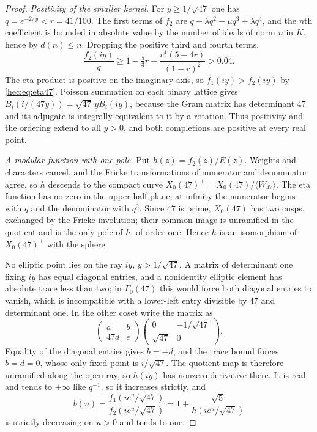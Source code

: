 \begin{proof}
\emph{Positivity of the smaller kernel.}
For $y\ge1/\sqrt{47}$ one has $q=e^{-2\pi y}<r=41/100$. The first terms of $f_2$ are
$q-\lambda q^2-\mu q^3+\lambda q^4$, and the $n$th coefficient is bounded in absolute value by the number
of ideals of norm $n$ in $K$, hence by $d(n)\le n$. Dropping the positive third and fourth terms,
\[
 \frac{f_2(iy)}q\ge1-\tfrac53r-\frac{r^4(5-4r)}{(1-r)^2}>0.04 .
\]
The eta product is positive on the imaginary axis, so $f_1(iy)>f_2(iy)$ by \eqref{hec:eq:eta47}. Poisson
summation on each binary lattice gives $B_i(i/(47y))=\sqrt{47}\,yB_i(iy)$, because the Gram matrix has
determinant $47$ and its adjugate is integrally equivalent to it by a rotation. Thus positivity and the
ordering extend to all $y>0$, and both completions are positive at every real point.

\emph{A modular function with one pole.}
Put $h(z)=f_2(z)/E(z)$. Weights and characters cancel, and the Fricke transformations of numerator and
denominator agree, so $h$ descends to the compact curve $X_0(47)^+=X_0(47)/\langle W_{47}\rangle$. The eta
function has no zero in the upper half-plane; at infinity the numerator begins with $q$ and the
denominator with $q^2$. Since $47$ is prime, $X_0(47)$ has two cusps, exchanged by the Fricke involution;
their common image is unramified in the quotient and is the only pole of $h$, of order one. Hence $h$ is an
isomorphism of $X_0(47)^+$ with the sphere.

No elliptic point lies on the ray $iy$, $y>1/\sqrt{47}$. A matrix of determinant one fixing $iy$ has equal
diagonal entries, and a nonidentity elliptic element has absolute trace less than two; in $\Gamma_0(47)$
this would force both diagonal entries to vanish, which is incompatible with a lower-left entry divisible
by $47$ and determinant one. In the other coset write the matrix as
\[
 \begin{pmatrix}a&b\\47d&e\end{pmatrix}
 \begin{pmatrix}0&-1/\sqrt{47}\\\sqrt{47}&0\end{pmatrix}.
\]
Equality of the diagonal entries gives $b=-d$, and the trace bound forces $b=d=0$, whose only fixed point
is $i/\sqrt{47}$. The quotient map is therefore unramified along the open ray, so $h(iy)$ has nonzero
derivative there. It is real and tends to $+\infty$ like $q^{-1}$, so it increases strictly, and
\[
 b(u)=\frac{f_1(ie^u/\sqrt{47})}{f_2(ie^u/\sqrt{47})}=1+\frac{\sqrt5}{h(ie^u/\sqrt{47})}
\]
is strictly decreasing on $u>0$ and tends to one.


\end{proof}
